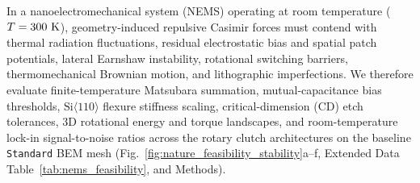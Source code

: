\documentclass[pdflatex,sn-nature]{sn-jnl}
\begin{document}
In a nanoelectromechanical system (NEMS) operating at room temperature ($T = 300{}\text{ K}$), geometry-induced repulsive Casimir forces must contend with thermal radiation fluctuations, residual electrostatic bias and spatial patch potentials, lateral Earnshaw instability, rotational switching barriers, thermomechanical Brownian motion, and lithographic imperfections. We therefore evaluate finite-temperature Matsubara summation, mutual-capacitance bias thresholds, $\text{Si}\langle 110\rangle$ flexure stiffness scaling, critical-dimension (CD) etch tolerances, 3D rotational energy and torque landscapes, and room-temperature lock-in signal-to-noise ratios across the rotary clutch architectures on the baseline \texttt{Standard} BEM mesh (Fig.~\ref{fig:nature_feasibility_stability}a--f, Extended Data Table~\ref{tab:nems_feasibility}, and Methods).
\end{document}

